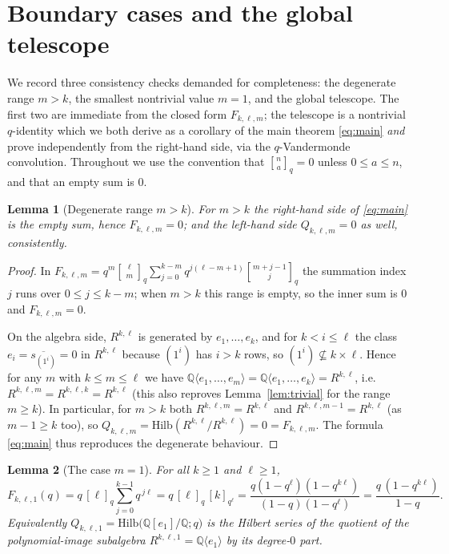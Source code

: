 \documentclass{amsart}
\newtheorem{lemma}{Lemma}
\theoremstyle{definition}
\newcommand{\Hilb}{\mathrm{Hilb}}
\newcommand{\qbin}[2]{\genfrac{[}{]}{0pt}{}{#1}{#2}_q}
\newcommand{\Q}{\mathbb{Q}}
\newcommand{\rkl}{R^{k,\ell}}
\newcommand{\Rklm}{R^{k,\ell,m}}
\begin{document}
\section{Boundary cases and the global telescope}
\label{sec:boundary}

We record three consistency checks demanded for completeness: the degenerate
range $m>k$, the smallest nontrivial value $m=1$, and the global telescope. The
first two are immediate from the closed form $F_{k,\ell,m}$; the telescope is a
nontrivial $q$-identity which we both derive as a corollary of the main theorem
\eqref{eq:main} \emph{and} prove independently from the right-hand side, via the
$q$-Vandermonde convolution. Throughout we use the convention that
$\qbin{n}{a}=0$ unless $0\le a\le n$, and that an empty sum is $0$.

\begin{lemma}[Degenerate range $m>k$]\label{lem:mbigk}
For $m>k$ the right-hand side of \eqref{eq:main} is the empty sum, hence
$F_{k,\ell,m}=0$; and the left-hand side $Q_{k,\ell,m}=0$ as well, consistently.
\end{lemma}

\begin{proof}
In $F_{k,\ell,m}=q^{m}\qbin{\ell}{m}\sum_{j=0}^{k-m}q^{j(\ell-m+1)}\qbin{m+j-1}{j}$
the summation index $j$ runs over $0\le j\le k-m$; when $m>k$ this range is empty,
so the inner sum is $0$ and $F_{k,\ell,m}=0$.

On the algebra side, $\rkl$ is generated by $e_1,\dots,e_k$, and for $k<i\le\ell$
the class $e_i=\overline{s_{(1^i)}}=0$ in $\rkl$ because $(1^i)$ has $i>k$ rows, so
$(1^i)\not\subseteq k\times\ell$. Hence for any $m$ with $k\le m\le\ell$ we have
$\Q\langle e_1,\dots,e_m\rangle=\Q\langle e_1,\dots,e_k\rangle=\rkl$, i.e.\
$\Rklm=R^{k,\ell,k}=\rkl$ (this also reproves Lemma~\ref{lem:trivial} for the
range $m\ge k$). In particular, for $m>k$ both $\Rklm=\rkl$ and
$R^{k,\ell,m-1}=\rkl$ (as $m-1\ge k$ too), so
$Q_{k,\ell,m}=\Hilb(\rkl/\rkl)=0=F_{k,\ell,m}$. The formula \eqref{eq:main} thus
reproduces the degenerate behaviour.
\end{proof}

\begin{lemma}[The case $m=1$]\label{lem:m1}
For all $k\ge1$ and $\ell\ge1$,
\[
F_{k,\ell,1}(q)=q\,[\ell]_q\sum_{j=0}^{k-1}q^{\,j\ell}
=q\,[\ell]_q\,[k]_{q^{\ell}}
=\frac{q(1-q^{\ell})(1-q^{k\ell})}{(1-q)(1-q^{\ell})}
=\frac{q\,(1-q^{k\ell})}{1-q}.
\]
Equivalently $Q_{k,\ell,1}=\Hilb\big(\Q[e_1]/\Q;q\big)$ is the Hilbert series of the
quotient of the polynomial-image subalgebra $R^{k,\ell,1}=\Q\langle e_1\rangle$ by
its degree-$0$ part.
\end{lemma}
\end{document}
